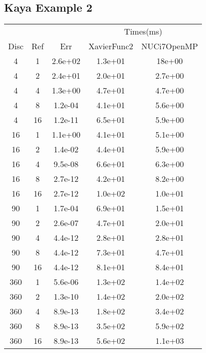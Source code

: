 \subsection{Kaya Example 2}
\begin{center}
\begin{tabular}{c|c|c|c|c}
	&&&\multicolumn{2}{|c}{Times(ms)}\\
	Disc&Ref&Err&XavierFunc2&NUCi7OpenMP\\
\hline
4&1&2.6e+02&1.3e+01&18e+00\\
4&2&2.4e+01&2.0e+01&2.7e+00\\
4&4&1.3e+00&4.7e+01&4.7e+00\\
4&8&1.2e-04&4.1e+01&5.6e+00\\
4&16&1.2e-11&6.5e+01&5.9e+00\\
\hline
16&1&1.1e+00&4.1e+01&5.1e+00\\
16&2&1.4e-02&4.4e+01&5.9e+00\\
16&4&9.5e-08&6.6e+01&6.3e+00\\
16&8&2.7e-12&4.2e+01&8.2e+00\\
16&16&2.7e-12&1.0e+02&1.0e+01\\
\hline
90&1&1.7e-04&6.9e+01&1.5e+01\\
90&2&2.6e-07&4.7e+01&2.0e+01\\
90&4&4.4e-12&2.8e+01&2.8e+01\\
90&8&4.4e-12&7.3e+01&4.7e+01\\
90&16&4.4e-12&8.1e+01&8.4e+01\\
\hline
360&1&5.6e-06&1.3e+02&1.4e+02\\
360&2&1.3e-10&1.4e+02&2.0e+02\\
360&4&8.9e-13&1.8e+02&3.4e+02\\
360&8&8.9e-13&3.5e+02&5.9e+02\\
360&16&8.9e-13&5.6e+02&1.1e+03\\
\hline
\end{tabular}
\end{center}







